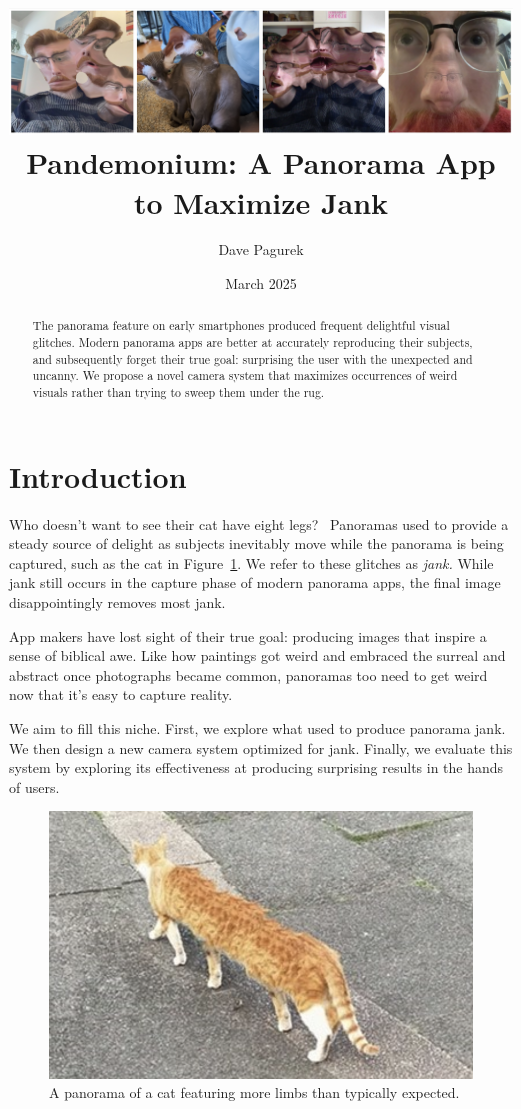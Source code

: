 \documentclass[twocolumn]{article}
\title{\includegraphics[width=\textwidth]{img/teaser.jpg}\\ Pandemonium: A Panorama App to Maximize Jank}
\author{Dave Pagurek}
\date{March 2025}
\begin{document}
\maketitle

\begin{abstract}
    The panorama feature on early smartphones produced frequent delightful visual glitches. Modern panorama apps are better at accurately reproducing their subjects, and subsequently forget their true goal: surprising the user with the unexpected and uncanny. We propose a novel camera system that maximizes occurrences of weird visuals rather than trying to sweep them under the rug.
\end{abstract}

\section{Introduction}

Who doesn't want to see their cat have eight legs?~\cite{cheezburger} Panoramas used to provide a steady source of delight as subjects inevitably move while the panorama is being captured, such as the cat in Figure~\ref{fig:cat}. We refer to these glitches as \textit{jank.} While jank still occurs in the capture phase of modern panorama apps, the final image disappointingly removes most jank.

App makers have lost sight of their true goal: producing images that inspire a sense of biblical awe. Like how paintings got weird and embraced the surreal and abstract once photographs became common, panoramas too need to get weird now that it's easy to capture reality.

We aim to fill this niche. First, we explore what used to produce panorama jank. We then design a new camera system optimized for jank. Finally, we evaluate this system by exploring its effectiveness at producing surprising results in the hands of users.

\begin{figure}
    \centering
    \includegraphics[width=0.78\linewidth]{img/cat-pano.png}
    \caption{A panorama of a cat featuring more limbs than typically expected.~\cite{cheezburger}}
    \label{fig:cat}
\end{figure}
\end{document}
